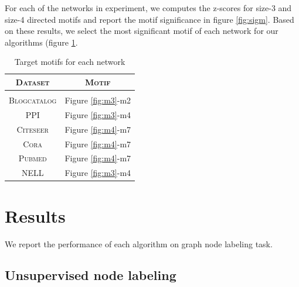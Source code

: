 \documentclass{article}
\theoremstyle{definition}
\begin{document}
\begin{table}
\centering
{}
\caption{Datasets for semi-supervised embeddings}
\label{t:ungraph}
\end{table}

For each of the networks in experiment, we computes the z-scores for
size-3 and size-4 directed motifs and report the motif significance
in figure \ref{fig:sigm}. Based on these results, 
we select the most significant motif of each network for our algorithms
(figure \ref{t:motifs}. 

\begin{table}
\centering
\begin{tabular}{c c}
\textsc{Dataset} & \textsc{Motif} \\
\hline \\
\textsc{Blogcatalog} & Figure \ref{fig:m3}-m2 \\
\textsc{PPI} & Figure \ref{fig:m3}-m4 \\
\textsc{Citeseer} & Figure \ref{fig:m4}-m7 \\
\textsc{Cora} & Figure \ref{fig:m4}-m7 \\
\textsc{Pubmed} & Figure \ref{fig:m4}-m7 \\
\textsc{NELL} & Figure \ref{fig:m3}-m4 \\
\end{tabular}%
\caption{Target motifs for each network}
\label{t:motifs}
\end{table}

\section{Results}

We report the performance of each algorithm on graph node
labeling task.

\subsection{Unsupervised node labeling}
\end{document}

